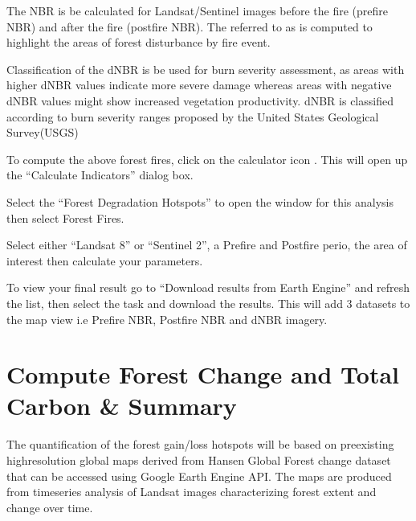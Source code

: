 \documentclass[letterpaper,10pt,english]{sphinxmanual}
\begin{document}
\sphinxAtStartPar
The NBR is be calculated for Landsat/Sentinel images before the fire (pre\sphinxhyphen{}fire NBR) and after
the fire (post\sphinxhyphen{}fire NBR). The  referred
to as  is computed to highlight the areas of forest disturbance by fire event.

\sphinxAtStartPar
Classification of the dNBR is be used for burn severity assessment, as areas with higher dNBR
values indicate more severe damage whereas areas with negative dNBR values might show increased
vegetation productivity. dNBR is classified according to burn severity ranges proposed by
the United States Geological Survey(USGS)

\sphinxAtStartPar
To compute the above forest fires, click on the calculator icon . This will open up the
“Calculate Indicators” dialog box.


\sphinxAtStartPar
Select the “Forest Degradation Hotspots” to open the window for this analysis then select Forest Fires.


\sphinxAtStartPar
Select either “Landsat 8” or  “Sentinel 2”, a Pre\sphinxhyphen{}fire and Post\sphinxhyphen{}fire perio, the area of interest then calculate
your parameters.


\sphinxAtStartPar
To view your final result go to “Download results from Earth Engine” and refresh the list, then select
the task and download the results. This will add 3 datasets to the map view i.e Prefire NBR, Postfire NBR and dNBR imagery.



\section{Compute Forest Change and Total Carbon \& Summary}
\label{\detokenize{Qgis_Plugin/Calculate_forest:compute-forest-change-and-total-carbon-summary}}
\sphinxAtStartPar
The quantification of the forest gain/loss hotspots will be based on pre\sphinxhyphen{}existing high\sphinxhyphen{}resolution
global maps derived from Hansen Global Forest change dataset that can be accessed using Google
Earth Engine API. The maps are produced from time\sphinxhyphen{}series analysis of Landsat images characterizing
forest extent and change over time.
\end{document}
